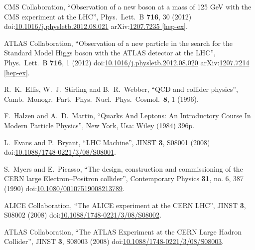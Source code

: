 \begin{thebibliography}{99}
CMS Collaboration, ``Observation of a new boson at a mass of 125 GeV with the CMS experiment at the LHC'', Phys.\ Lett.\ B {\bf 716}, 30 (2012) doi:\href{http://dx.doi.org/10.1016/j.physletb.2012.08.021}{10.1016/j.physletb.2012.08.021} arXiv:\href{https://arxiv.org/abs/1207.7235}{1207.7235 [hep-ex]}.

ATLAS Collaboration, ``Observation of a new particle in the search for the Standard Model Higgs boson with the ATLAS detector at the LHC'', Phys.\ Lett.\ B {\bf 716}, 1 (2012) doi:\href{http://dx.doi.org/10.1016/j.physletb.2012.08.020}{10.1016/j.physletb.2012.08.020} arXiv:\href{https://arxiv.org/abs/1207.7214}{1207.7214 [hep-ex]}.


R.~K.~Ellis, W.~J.~Stirling and B.~R.~Webber, ``QCD and collider physics'', Camb.\ Monogr.\ Part.\ Phys.\ Nucl.\ Phys.\ Cosmol.\  {\bf 8}, 1 (1996).

F.~Halzen and A.~D.~Martin, ``Quarks And Leptons: An Introductory Course In Modern Particle Physics'', New York, Usa: Wiley (1984) 396p.




L.~Evans and P.~Bryant, ``LHC Machine'', JINST {\bf 3}, S08001 (2008) doi:\href{http://dx.doi.org/10.1088/1748-0221/3/08/S08001}{10.1088/1748-0221/3/08/S08001}.

S.~Myers and E.~Picasso, ``The design, construction and commissioning of the CERN large Electron–Positron collider'', Contemporary Physics {\bf 31}, no. 6, 387 (1990) doi:\href{https://doi.org/10.1080/00107519008213789}{10.1080/00107519008213789}.

ALICE Collaboration, ``The ALICE experiment at the CERN LHC'', JINST {\bf 3}, S08002 (2008) doi:\href{http://dx.doi.org/10.1088/1748-0221/3/08/S08002}{10.1088/1748-0221/3/08/S08002}.

ATLAS Collaboration, ``The ATLAS Experiment at the CERN Large Hadron Collider'', JINST {\bf 3}, S08003 (2008) doi:\href{http://dx.doi.org/10.1088/1748-0221/3/08/S08003}{10.1088/1748-0221/3/08/S08003}.


\end{thebibliography}
